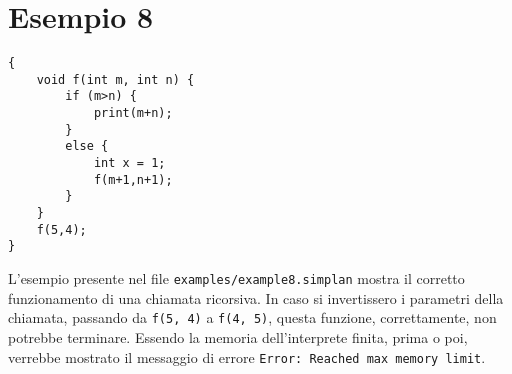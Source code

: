 \documentclass[../report.tex]{subfiles}
\begin{document}
\section{Esempio 8}
\begin{lstlisting}
{
    void f(int m, int n) {
        if (m>n) {
            print(m+n);
        }
        else {
            int x = 1;
            f(m+1,n+1);
        }
    }
    f(5,4);
}
\end{lstlisting}
L'esempio presente nel file \verb|examples/example8.simplan| mostra il corretto funzionamento di una chiamata ricorsiva. In caso si invertissero i parametri della chiamata, passando da \verb|f(5, 4)| a \verb|f(4, 5)|, questa funzione, correttamente, non potrebbe terminare. Essendo la memoria dell'interprete finita, prima o poi, verrebbe mostrato il messaggio di errore \verb|Error: Reached max memory limit|.
\end{document}
